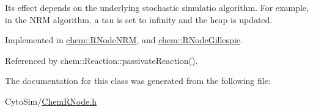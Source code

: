 Its effect depends on the underlying stochastic simulatio algorithm. For example, in the N\-R\-M algorithm, a tau is set to infinity and the heap is updated. 

Implemented in \hyperlink{classchem_1_1RNodeNRM_a1099526d4e797a6d033ad6f60b76dc12}{chem\-::\-R\-Node\-N\-R\-M}, and \hyperlink{classchem_1_1RNodeGillespie_a6b641601ec312a4169f07e2dcf797f41}{chem\-::\-R\-Node\-Gillespie}.



Referenced by chem\-::\-Reaction\-::passivate\-Reaction().



The documentation for this class was generated from the following file\-:\begin{DoxyCompactItemize}
\item 
Cyto\-Sim/\hyperlink{ChemRNode_8h}{Chem\-R\-Node.\-h}\end{DoxyCompactItemize}
